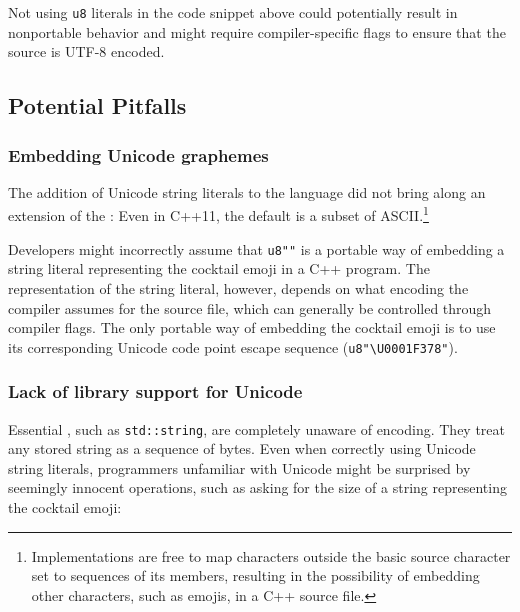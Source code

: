\noindent Not using \lstinline!u8! literals in the code snippet above could potentially result in
nonportable behavior and might require compiler-specific flags to
ensure that the source is UTF-8 encoded.

\subsection[Potential Pitfalls]{Potential Pitfalls}\label{potential-pitfalls}

\subsubsection[Embedding Unicode graphemes]{Embedding Unicode graphemes}\label{embedding-unicode-graphemes}

The addition of Unicode string literals to the language did not bring
along an extension of the : Even in C++11, the
default  is a subset of
ASCII.{\cprotect\footnote{Implementations are free to map characters
outside the basic source character set to sequences of its members,
resulting in the possibility of embedding other characters, such as emojis, in a C++ source file.}}

Developers might incorrectly assume that \lstinline!u8"!\martini\lstinline!"! is a
portable way of embedding a string literal representing the cocktail
emoji in a C++ program. The representation of the string literal, however, depends on what
encoding the compiler assumes for the source file, which can generally
be controlled through compiler flags. The only portable way of embedding
the cocktail emoji is to use its corresponding Unicode code point escape
sequence (\lstinline!u8"\U0001F378"!).

\subsubsection[Lack of library support for Unicode]{Lack of library support for Unicode}\label{lack-of-library-support-for-unicode}

Essential , such as \lstinline!std::string!, are
completely unaware of encoding. They treat any stored string as a
sequence of bytes. Even when correctly using Unicode string literals,
programmers unfamiliar with Unicode might be surprised by seemingly
innocent operations, such as asking for the size of a string
representing the cocktail emoji:

